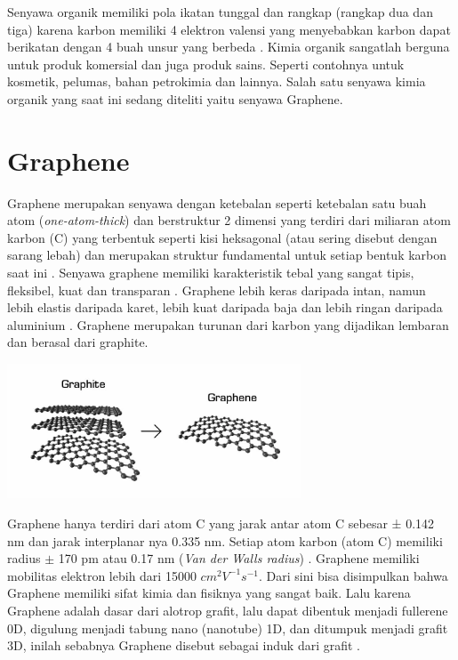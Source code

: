 \documentclass[12pt,a4paper]{report}
\begin{document}
	Senyawa organik memiliki pola ikatan tunggal dan rangkap (rangkap dua dan tiga) karena karbon memiliki 4 elektron valensi yang menyebabkan karbon dapat berikatan dengan 4 buah unsur yang berbeda \cite{Clayden2012}. Kimia organik sangatlah berguna untuk produk komersial dan juga produk sains. Seperti contohnya untuk kosmetik, pelumas, bahan petrokimia dan lainnya. Salah satu senyawa kimia organik yang saat ini sedang diteliti yaitu senyawa Graphene.
	
	\section{Graphene}
	Graphene merupakan senyawa dengan ketebalan seperti ketebalan satu buah atom (\textit{one-atom-thick}) dan berstruktur 2 dimensi yang terdiri dari miliaran atom karbon (C) yang terbentuk seperti kisi heksagonal (atau sering disebut dengan sarang lebah) dan merupakan struktur fundamental untuk setiap bentuk karbon saat ini \cite{Clemons2010}\cite{Sahu2017}. Senyawa graphene memiliki karakteristik tebal yang sangat tipis, fleksibel, kuat dan transparan \cite{Ni2015}. Graphene lebih keras daripada intan, namun lebih elastis daripada karet, lebih kuat daripada baja dan lebih ringan daripada aluminium \cite{Berger2019}. Graphene merupakan turunan dari karbon yang dijadikan lembaran dan berasal dari graphite.
	
	\begin{center}
		\includegraphics[width=8.75cm]{gambar/grafit.png}
	\end{center}
	
	Graphene hanya terdiri dari atom C yang jarak antar atom C sebesar ± 0.142 nm \cite{Zhen2017} dan jarak interplanar nya 0.335 nm. Setiap atom karbon (atom C) memiliki radius $\pm$ 170 pm atau 0.17 nm (\textit{Van der Walls radius}) \cite{10.1088/2053-2563/ab35d1ch1}. Graphene memiliki mobilitas elektron lebih dari 15000 $ cm^2 V^{-1} s^{-1} $. Dari sini bisa disimpulkan bahwa Graphene memiliki sifat kimia dan fisiknya yang sangat baik. Lalu karena Graphene adalah dasar dari alotrop grafit, lalu dapat dibentuk menjadi fullerene 0D, digulung menjadi tabung nano (nanotube) 1D, dan ditumpuk menjadi grafit 3D, inilah sebabnya Graphene disebut sebagai induk dari grafit \cite{Chakraborty2018}.
		
\end{document}
